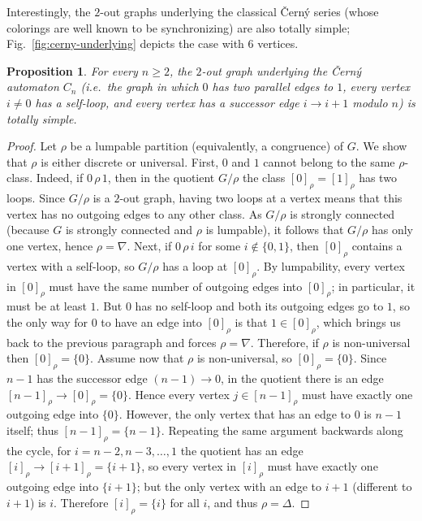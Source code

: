 \documentclass[a4paper,10pt]{amsart}
\theoremstyle{plain}
\newtheorem{proposition}[theorem]{Proposition}
\theoremstyle{definition}
\begin{document}
Interestingly, the $2$-out graphs underlying the classical \v{C}ern\'y series (whose colorings are well known to be synchronizing) are also totally simple; Fig.~\ref{fig:cerny-underlying} depicts the case with $6$ vertices.
\begin{proposition}\label{prop:cerny-underlying-totally-simple}
For every $n\ge 2$, the $2$-out graph underlying the \v{C}ern\'y automaton $C_n$ (i.e.\ the graph in which
$0$ has two parallel edges to $1$, every vertex $i\neq 0$ has a self-loop, and every vertex has a successor edge
$i\to i+1$ modulo $n$) is totally simple.
\end{proposition}
\begin{proof}
Let $\rho$ be a lumpable partition (equivalently, a congruence) of $G$.
We show that $\rho$ is either discrete or universal. First, $0$ and $1$ cannot belong to the same $\rho$-class.
Indeed, if $0\,\rho\,1$, then in the quotient $G/\rho$ the class $[0]_\rho=[1]_\rho$ has two loops. Since $G/\rho$ is a $2$-out graph, having two loops at a vertex means that this vertex has no outgoing edges to any other class.
As $G/\rho$ is strongly connected (because $G$ is strongly connected and $\rho$ is lumpable), it follows that $G/\rho$ has only one
vertex, hence $\rho=\nabla$. Next, if $0\,\rho\,i$ for some $i\notin\{0,1\}$, then $[0]_\rho$ contains a vertex with a self-loop, so $G/\rho$ has a loop at $[0]_\rho$.
By lumpability, every vertex in $[0]_\rho$ must have the same number of outgoing edges into $[0]_\rho$; in particular, it must be at least $1$.
But $0$ has no self-loop and both its outgoing edges go to $1$, so the only way for $0$ to have an edge into $[0]_\rho$ is that $1\in[0]_\rho$,
which brings us back to the previous paragraph and forces $\rho=\nabla$.
Therefore, if $\rho$ is non-universal then $[0]_\rho=\{0\}$. Assume now that $\rho$ is non-universal, so $[0]_\rho=\{0\}$.
Since $n-1$ has the successor edge $(n-1)\to 0$, in the quotient there is an edge $[n-1]_\rho\to[0]_\rho=\{0\}$.
Hence every vertex $j\in[n-1]_\rho$ must have exactly one outgoing edge into $\{0\}$. However, the only vertex that has an edge to $0$ is $n-1$ itself; thus $[n-1]_\rho=\{n-1\}$. Repeating the same argument backwards along the cycle, for $i=n-2,n-3,\dots,1$ the quotient has an edge $[i]_\rho\to[i+1]_\rho=\{i+1\}$, so every vertex in $[i]_\rho$ must have exactly one outgoing edge into $\{i+1\}$; but the only vertex with an edge to $i+1$ (different to $i+1$) is $i$. Therefore $[i]_\rho=\{i\}$ for all $i$, and thus $\rho=\Delta$.
\end{proof}
\end{document}
